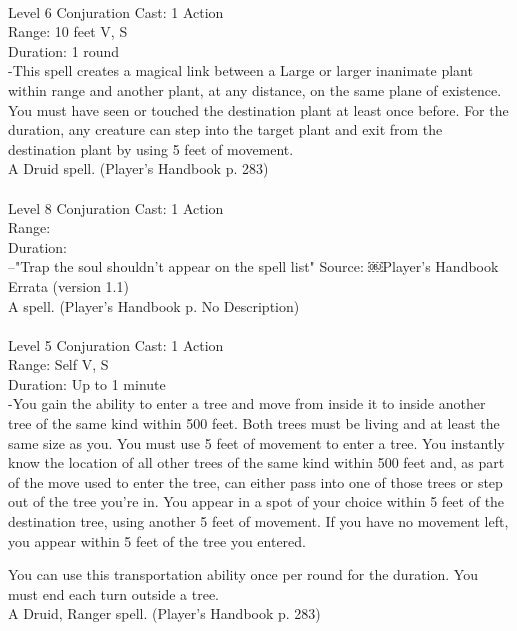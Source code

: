 \documentclass[10pt,twocolumn]{report}
\begin{document}
 \\
Level 6 \quad Conjuration \quad Cast: 1 Action\\
Range: 10 feet \quad V, S\\
Duration: 1 round \quad \\
-This spell creates a magical link between a Large or larger inanimate plant within range and another plant, at any distance, on the same plane of existence. You must have seen or touched the destination plant at least once before. For the duration, any creature can step into the target plant and exit from the destination plant by using 5 feet of movement.\\
A Druid spell. (Player's Handbook p. 283) \\


 \\
Level 8 \quad Conjuration \quad Cast: 1 Action\\
Range:  \quad \\
Duration:  \quad \\
--"Trap the soul shouldn’t appear on the spell list"
Source: ￼Player’s Handbook Errata (version 1.1)\\
A  spell. (Player's Handbook p. No Description) \\


 \\
Level 5 \quad Conjuration \quad Cast: 1 Action\\
Range: Self \quad V, S\\
Duration: Up to 1 minute \quad \\
-You gain the ability to enter a tree and move from inside it to inside another tree of the same kind within 500 feet.
Both trees must be living and at least the same size as you. You must use 5 feet of movement to enter a tree. You instantly know the location of all other trees of the same kind within 500 feet and, as part of the move used to enter the tree, can either pass into one of those trees or step out of the tree you’re in. You appear in a spot of your choice within 5 feet of the destination tree, using another 5 feet of movement. If you have no movement left, you appear within 5 feet of the tree you entered.

You can use this transportation ability once per round for the duration. You must end each turn outside a tree.\\
A Druid, Ranger spell. (Player's Handbook p. 283) \\
\end{document}
